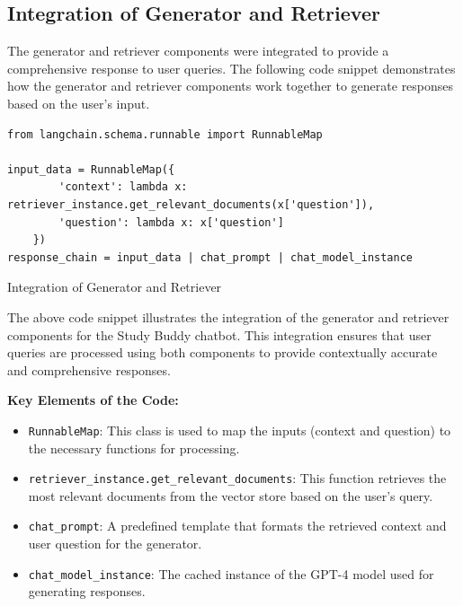 \subsection{Integration of Generator and Retriever}
The generator and retriever components were integrated to provide a comprehensive response to user queries. The following code snippet demonstrates how the generator and retriever components work together to generate responses based on the user's input.

\begin{listing}[H]
\begin{verbatim}
from langchain.schema.runnable import RunnableMap

input_data = RunnableMap({
        'context': lambda x: retriever_instance.get_relevant_documents(x['question']),
        'question': lambda x: x['question']
    })
response_chain = input_data | chat_prompt | chat_model_instance
\end{verbatim}
\caption{Integration of Generator and Retriever}
\label{listing:Integration_Generator_Retriever}
\end{listing}

The above code snippet illustrates the integration of the generator and retriever components for the Study Buddy chatbot. This integration ensures that user queries are processed using both components to provide contextually accurate and comprehensive responses.

\textbf{Key Elements of the Code:}
\begin{itemize}
    \item \texttt{RunnableMap}: This class is used to map the inputs (context and question) to the necessary functions for processing.
    \item \texttt{retriever\_instance.get\_relevant\_documents}: This function retrieves the most relevant documents from the vector store based on the user's query.
    \item \texttt{chat\_prompt}: A predefined template that formats the retrieved context and user question for the generator.
    \item \texttt{chat\_model\_instance}: The cached instance of the GPT-4 model used for generating responses.
\end{itemize}

